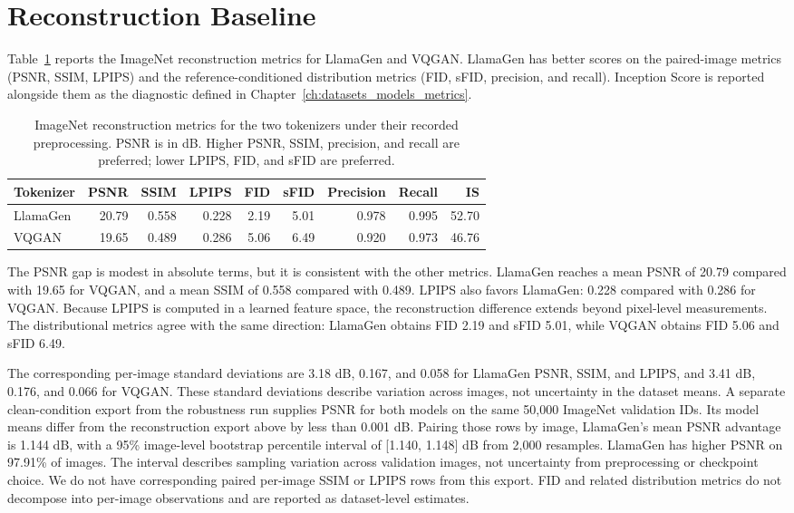 \section{Reconstruction Baseline}
\label{sec:rq1_reconstruction_baseline}

Table~\ref{tab:rq1_reconstruction_metrics} reports the ImageNet reconstruction metrics for LlamaGen and VQGAN. LlamaGen has better scores on the paired-image metrics (PSNR, SSIM, LPIPS) and the reference-conditioned distribution metrics (FID, sFID, precision, and recall). Inception Score is reported alongside them as the diagnostic defined in Chapter~\ref{ch:datasets_models_metrics}.

\begin{table}[t]
    \centering
    \small
    \setlength{\tabcolsep}{4pt}
    \begin{tabular}{lrrrrrrrr}
        \textbf{Tokenizer} & \textbf{PSNR} & \textbf{SSIM} & \textbf{LPIPS} & \textbf{FID} & \textbf{sFID} & \textbf{Precision} & \textbf{Recall} & \textbf{IS} \\ \hline
        LlamaGen & 20.79 & 0.558 & 0.228 & 2.19 & 5.01 & 0.978 & 0.995 & 52.70 \\
        VQGAN    & 19.65 & 0.489 & 0.286 & 5.06 & 6.49 & 0.920 & 0.973 & 46.76 \\
    \end{tabular}
    \caption{ImageNet reconstruction metrics for the two tokenizers under their recorded preprocessing. PSNR is in dB. Higher PSNR, SSIM, precision, and recall are preferred; lower LPIPS, FID, and sFID are preferred.}
    \label{tab:rq1_reconstruction_metrics}
\end{table}

The PSNR gap is modest in absolute terms, but it is consistent with the other metrics. LlamaGen reaches a mean PSNR of 20.79 compared with 19.65 for VQGAN, and a mean SSIM of 0.558 compared with 0.489. LPIPS also favors LlamaGen: 0.228 compared with 0.286 for VQGAN. Because LPIPS is computed in a learned feature space, the reconstruction difference extends beyond pixel-level measurements. The distributional metrics agree with the same direction: LlamaGen obtains FID 2.19 and sFID 5.01, while VQGAN obtains FID 5.06 and sFID 6.49.

The corresponding per-image standard deviations are 3.18 dB, 0.167, and
0.058 for LlamaGen PSNR, SSIM, and LPIPS, and 3.41 dB, 0.176, and 0.066 for
VQGAN. These standard deviations describe variation across images, not
uncertainty in the dataset means. A separate clean-condition export from the
robustness run supplies PSNR for both models on the same 50{,}000 ImageNet
validation IDs. Its model means differ from the reconstruction export above by
less than 0.001 dB. Pairing those rows by image, LlamaGen's mean PSNR advantage
is 1.144 dB, with a 95\% image-level bootstrap percentile interval of
[1.140, 1.148] dB from 2{,}000 resamples. LlamaGen has higher PSNR on 97.91\%
of images. The interval describes sampling variation across validation
images, not uncertainty from preprocessing or checkpoint choice. We do not
have corresponding paired per-image SSIM or LPIPS rows from this export. FID
and related distribution metrics do not decompose into per-image observations
and are reported as dataset-level estimates.

